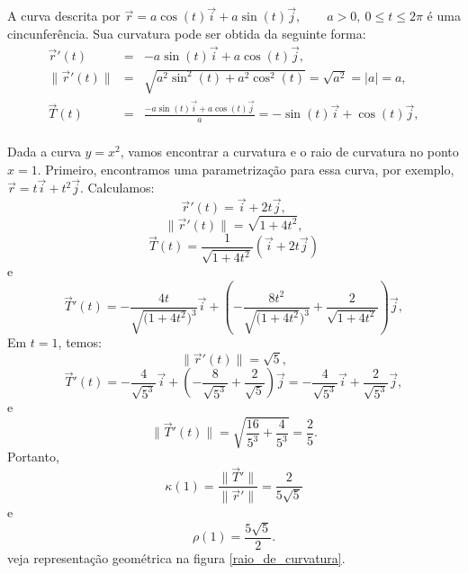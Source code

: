 \begin{ex}A curva descrita por $\vec{r}=a\cos(t)\vec{i}+a\sin(t)\vec{j},\qquad a>0,\ 0\leq t\leq 2\pi$ é uma cincunferência. Sua curvatura pode ser obtida da seguinte forma:
\begin{eqnarray}
 \vec{r}'(t)&=&-a\sin(t)\vec{i}+a\cos(t)\vec{j},\\
 \|\vec{r}'(t)\|&=&\sqrt{a^2\sin^2(t)+a^2\cos^2(t)}=\sqrt{a^2}=|a|=a,\\
 \vec{T}(t)&=&\frac{-a\sin(t)\vec{i}+a\cos(t)\vec{j}}{a}=-\sin(t)\vec{i}+\cos(t)\vec{j},\\
\end{eqnarray}

\end{ex}
\begin{ex}Dada a curva $y=x^2$, vamos encontrar a curvatura e o raio de curvatura no ponto $x=1$. Primeiro, encontramos uma parametrização para essa curva, por exemplo, $\vec{r}=t\vec{i}+t^2\vec{j}$. Calculamos:
$$
\vec{r}'(t)=\vec{i}+2t\vec{j},
$$
$$
\|\vec{r}'(t)\|=\sqrt{1+4t^2},
$$
$$
\vec{T}(t)=\frac{1}{\sqrt{1+4t^2}}\left(\vec{i}+2t\vec{j}\right)
$$
e
$$
\vec{T}'(t)=-\frac{4t}{\sqrt{(1+4t^2})^3}\vec{i}+\left(-\frac{8t^2}{\sqrt{(1+4t^2})^3}+\frac{2}{\sqrt{1+4t^2}}\right)\vec{j},
$$
Em $t=1$, temos:
$$
\|\vec{r}'(t)\|=\sqrt{5},
$$
$$
\vec{T}'(t)=-\frac{4}{\sqrt{5^3}}\vec{i}+\left(-\frac{8}{\sqrt{5^3}}+\frac{2}{\sqrt{5}}\right)\vec{j}=-\frac{4}{\sqrt{5^3}}\vec{i}+\frac{2}{\sqrt{5^3}}\vec{j},
$$
e
$$
\|\vec{T}'(t)\|=\sqrt{\frac{16}{5^3}+\frac{4}{5^3}}=\frac{2}{5}.
$$
Portanto,
$$
\kappa(1)=\frac{\|\vec{T}'\|}{\|\vec{r}'\|}=\frac{2}{5\sqrt{5}}
$$
e
$$
\rho(1)=\frac{5\sqrt{5}}{2}.
$$
veja representação geométrica na figura \ref{raio_de_curvatura}.
\end{ex}

